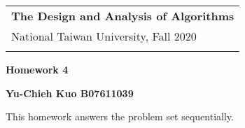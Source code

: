\documentclass[a4paper,12pt]{article}
\begin{document}
\thispagestyle{plain} %

\begin{tabular}{p{15.5cm}} %
{\large \bf The Design and Analysis of Algorithms} \\
National Taiwan University, Fall 2020  \\
\hline %
\\
\end{tabular} %

\vspace*{0.3cm} %

\begin{center} %
	{\Large \bf Homework 4} %
	\vspace{2mm}
	
	{\bf Yu-Chieh Kuo B07611039} %
		
\end{center}  
\vspace{0.4cm}

This homework answers the problem set sequentially. 
\end{document}
